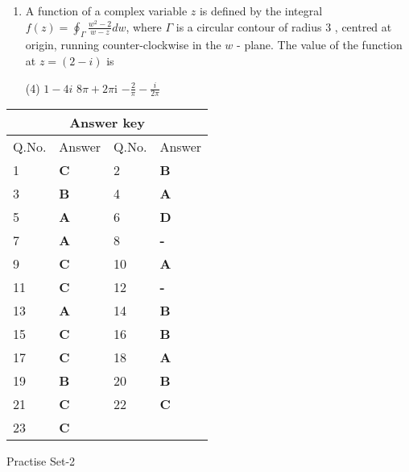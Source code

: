 \begin{enumerate}[label=\color{ocre}\textbf{\arabic*.}]
	\item  A function of a complex variable $z$ is defined by the integral $f(z)=\oint_{\Gamma} \frac{w^{2}-2}{w-z} d w$, where $\Gamma$ is a circular contour of radius 3 , centred at origin, running counter-clockwise in the $w$ - plane. The value of the function at $z=(2-i)$ is
	{}
	\begin{tasks}(4)
		\task[\textbf{B.}] $1-4 i$
		\task[\textbf{C.}]  $8 \pi+2 \pi \mathrm{i}$
		\task[\textbf{D.}] $-\frac{2}{\pi}-\frac{i}{2 \pi}$
	\end{tasks}
	
\end{enumerate}
\setlength\arrayrulewidth{1pt}
\begin{table}[H]
	\centering
	\begin{tabular}{|p{1.5cm}|p{1.5cm}||p{1.5cm}|p{1.5cm}|}
		\hline
		\multicolumn{4}{|c|}{\textbf{Answer key}}\\\hline\hline
		\rowcolor{ocrel}Q.No.&Answer&Q.No.&Answer\\\hline
		1&\textbf{C} &2&\textbf{B}\\\hline 
		3&\textbf{B} &4&\textbf{A} \\\hline
		5&\textbf{A} &6&\textbf{D} \\\hline
		7&\textbf{A}&8&\textbf{-}\\\hline
		9&\textbf{C}&10&\textbf{A}\\\hline
		11&\textbf{C} &12&\textbf{-}\\\hline
		13&\textbf{A}&14&\textbf{B}\\\hline
		15&\textbf{C}&16&\textbf{B}\\\hline
		17&\textbf{C} &18&\textbf{A}\\\hline
		19&\textbf{B}&20&\textbf{B}\\\hline
		21&\textbf{C}&22&\textbf{C}\\\hline
		23&\textbf{C}& &\\\hline
		
	\end{tabular}
\end{table}
\newpage
\begin{abox}
	Practise Set-2
\end{abox}

